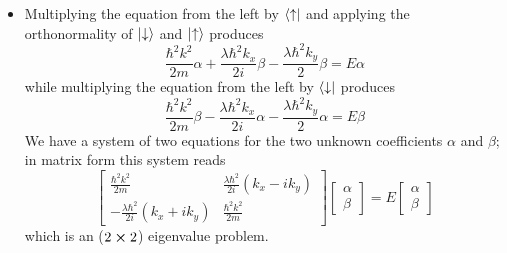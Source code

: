 \documentclass[11pt, a4paper]{article}
\newcommand{\ua}{\uparrow}  %
\newcommand{\da}{\downarrow}  %
\begin{document}
\begin{itemize}
	\item Multiplying the equation from the left by $ \bra{\ua} $ and applying the orthonormality of $ \ket{\da} $ and $ \ket{\ua} $ produces
	\begin{equation*}
		\frac{\hbar^{2}k^{2}}{2m} \alpha + \frac{\lambda \hbar^{2}k_{x}}{2i} \beta - \frac{\lambda \hbar^{2}k_{y}}{2} \beta = E \alpha
	\end{equation*}
	while multiplying the equation from the left by $ \bra{\da} $ produces
	\begin{equation*}
		\frac{\hbar^{2}k^{2}}{2m} \beta - \frac{\lambda \hbar^{2}k_{x}}{2i} \alpha - \frac{\lambda \hbar^{2}k_{y}}{2} \alpha = E \beta
	\end{equation*}
	We have a system of two equations for the two unknown coefficients $ \alpha $ and $ \beta $; in matrix form this system reads
	\begin{equation*}
		\begin{bmatrix}
		\frac{\hbar^{2}k^{2}}{2m} & \frac{\lambda \hbar^{2}}{2i}(k_{x}-ik_{y}) \\
		-\frac{\lambda \hbar^{2}}{2i}(k_{x}+ik_{y}) & \frac{\hbar^{2}k^{2}}{2m}
		\end{bmatrix}
		\begin{bmatrix}
			\alpha\\
			\beta
		\end{bmatrix}
		= E
		\begin{bmatrix}
			\alpha\\
			\beta
		\end{bmatrix}
	\end{equation*}
	which is an ($ 2 \cross 2 $) eigenvalue problem.
	

\end{itemize}
\end{document}

